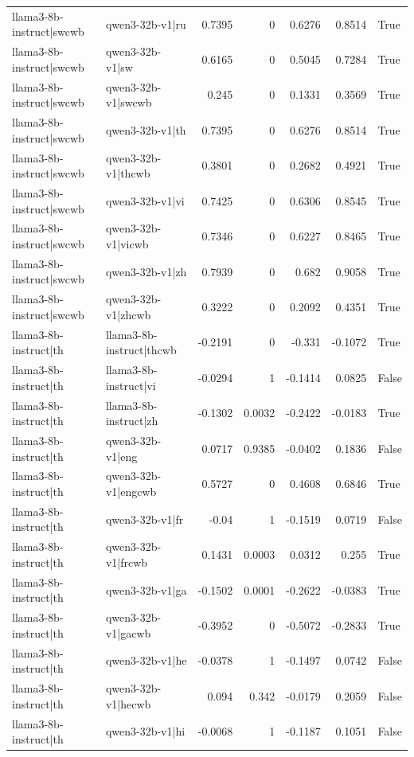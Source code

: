 \begin{table}
\begin{tabular}{l l r r r r l}
llama3-8b-instruct|swcwb & qwen3-32b-v1|ru & 0.7395 & 0 & 0.6276 & 0.8514 & True \\
llama3-8b-instruct|swcwb & qwen3-32b-v1|sw & 0.6165 & 0 & 0.5045 & 0.7284 & True \\
llama3-8b-instruct|swcwb & qwen3-32b-v1|swcwb & 0.245 & 0 & 0.1331 & 0.3569 & True \\
llama3-8b-instruct|swcwb & qwen3-32b-v1|th & 0.7395 & 0 & 0.6276 & 0.8514 & True \\
llama3-8b-instruct|swcwb & qwen3-32b-v1|thcwb & 0.3801 & 0 & 0.2682 & 0.4921 & True \\
llama3-8b-instruct|swcwb & qwen3-32b-v1|vi & 0.7425 & 0 & 0.6306 & 0.8545 & True \\
llama3-8b-instruct|swcwb & qwen3-32b-v1|vicwb & 0.7346 & 0 & 0.6227 & 0.8465 & True \\
llama3-8b-instruct|swcwb & qwen3-32b-v1|zh & 0.7939 & 0 & 0.682 & 0.9058 & True \\
llama3-8b-instruct|swcwb & qwen3-32b-v1|zhcwb & 0.3222 & 0 & 0.2092 & 0.4351 & True \\
llama3-8b-instruct|th & llama3-8b-instruct|thcwb & -0.2191 & 0 & -0.331 & -0.1072 & True \\
llama3-8b-instruct|th & llama3-8b-instruct|vi & -0.0294 & 1 & -0.1414 & 0.0825 & False \\
llama3-8b-instruct|th & llama3-8b-instruct|zh & -0.1302 & 0.0032 & -0.2422 & -0.0183 & True \\
llama3-8b-instruct|th & qwen3-32b-v1|eng & 0.0717 & 0.9385 & -0.0402 & 0.1836 & False \\
llama3-8b-instruct|th & qwen3-32b-v1|engcwb & 0.5727 & 0 & 0.4608 & 0.6846 & True \\
llama3-8b-instruct|th & qwen3-32b-v1|fr & -0.04 & 1 & -0.1519 & 0.0719 & False \\
llama3-8b-instruct|th & qwen3-32b-v1|frcwb & 0.1431 & 0.0003 & 0.0312 & 0.255 & True \\
llama3-8b-instruct|th & qwen3-32b-v1|ga & -0.1502 & 0.0001 & -0.2622 & -0.0383 & True \\
llama3-8b-instruct|th & qwen3-32b-v1|gacwb & -0.3952 & 0 & -0.5072 & -0.2833 & True \\
llama3-8b-instruct|th & qwen3-32b-v1|he & -0.0378 & 1 & -0.1497 & 0.0742 & False \\
llama3-8b-instruct|th & qwen3-32b-v1|hecwb & 0.094 & 0.342 & -0.0179 & 0.2059 & False \\
llama3-8b-instruct|th & qwen3-32b-v1|hi & -0.0068 & 1 & -0.1187 & 0.1051 & False \\

\end{tabular}
\end{table}
